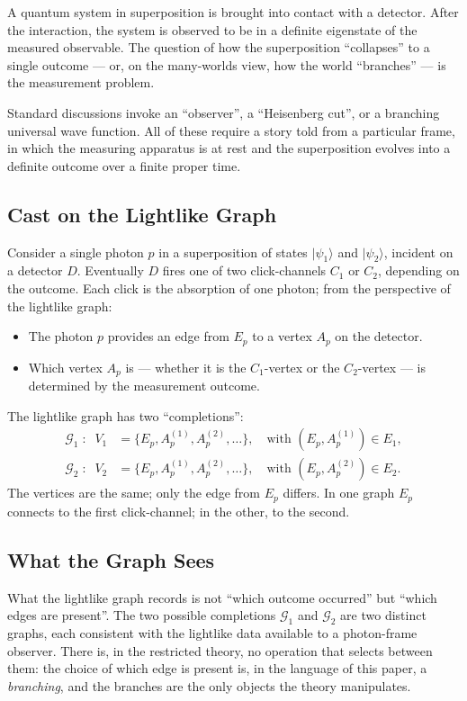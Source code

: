 \documentclass[11pt]{article}
\newcommand{\ket}[1]{|#1\rangle}
\begin{document}
A quantum system in superposition is brought into contact with a detector. After the interaction, the system is observed to be in a definite eigenstate of the measured observable. The question of how the superposition ``collapses'' to a single outcome --- or, on the many-worlds view, how the world ``branches'' --- is the measurement problem.

Standard discussions invoke an ``observer'', a ``Heisenberg cut'', or a branching universal wave function. All of these require a story told from a particular frame, in which the measuring apparatus is at rest and the superposition evolves into a definite outcome over a finite proper time.

\subsection{Cast on the Lightlike Graph}

Consider a single photon $p$ in a superposition of states $\ket{\psi_1}$ and $\ket{\psi_2}$, incident on a detector $D$. Eventually $D$ fires one of two click-channels $C_1$ or $C_2$, depending on the outcome. Each click is the absorption of one photon; from the perspective of the lightlike graph:
\begin{itemize}
    \item The photon $p$ provides an edge from $E_p$ to a vertex $A_p$ on the detector.
    \item Which vertex $A_p$ is --- whether it is the $C_1$-vertex or the $C_2$-vertex --- is determined by the measurement outcome.
\end{itemize}

The lightlike graph has two ``completions'':
\begin{align}
\mathcal{G}_1 \;:\;\; V_1 &= \{E_p, A_p^{(1)}, A_p^{(2)}, \ldots\}, \quad \text{with } (E_p, A_p^{(1)}) \in E_1,\\
\mathcal{G}_2 \;:\;\; V_2 &= \{E_p, A_p^{(1)}, A_p^{(2)}, \ldots\}, \quad \text{with } (E_p, A_p^{(2)}) \in E_2.
\end{align}
The vertices are the same; only the edge from $E_p$ differs. In one graph $E_p$ connects to the first click-channel; in the other, to the second.

\subsection{What the Graph Sees}

What the lightlike graph records is not ``which outcome occurred'' but ``which edges are present''. The two possible completions $\mathcal{G}_1$ and $\mathcal{G}_2$ are two distinct graphs, each consistent with the lightlike data available to a photon-frame observer. There is, in the restricted theory, no operation that selects between them: the choice of which edge is present is, in the language of this paper, a \emph{branching}, and the branches are the only objects the theory manipulates.
\end{document}
